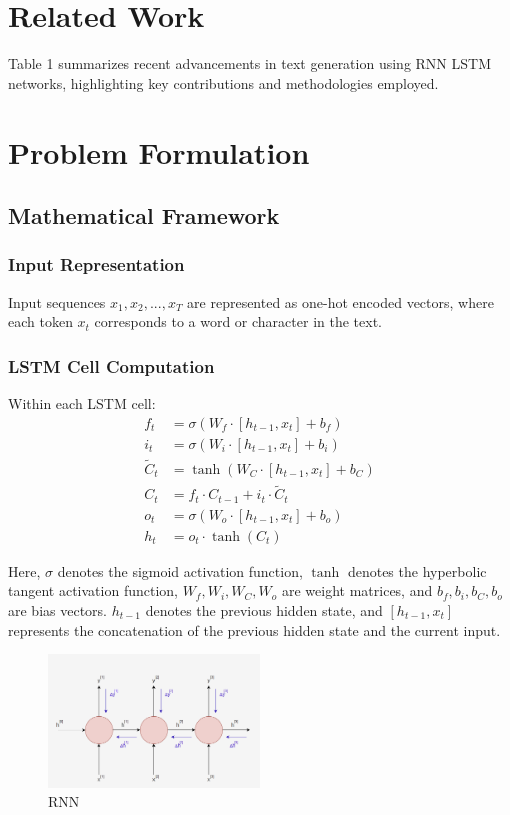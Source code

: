 \documentclass[conference]{IEEEtran}
\begin{document}
\section{Related Work}
Table 1 summarizes recent advancements in text generation using RNN LSTM networks, highlighting key contributions and methodologies employed.



\section{Problem Formulation}
\subsection{Mathematical Framework}

\subsubsection{Input Representation}
Input sequences \( x_1, x_2, ..., x_T \) are represented as one-hot encoded vectors, where each token \( x_t \) corresponds to a word or character in the text.

\subsubsection{LSTM Cell Computation}
Within each LSTM cell:
\begin{align}
f_t &= \sigma(W_f \cdot [h_{t-1}, x_t] + b_f) \\
i_t &= \sigma(W_i \cdot [h_{t-1}, x_t] + b_i) \\
\tilde{C}_t &= \tanh(W_C \cdot [h_{t-1}, x_t] + b_C) \\
C_t &= f_t \cdot C_{t-1} + i_t \cdot \tilde{C}_t \\
o_t &= \sigma(W_o \cdot [h_{t-1}, x_t] + b_o) \\
h_t &= o_t \cdot \tanh(C_t)
\end{align}

Here, \( \sigma \) denotes the sigmoid activation function, \( \tanh \) denotes the hyperbolic tangent activation function, \( W_f, W_i, W_C, W_o \) are weight matrices, and \( b_f, b_i, b_C, b_o \) are bias vectors. \( h_{t-1} \) denotes the previous hidden state, and \( [h_{t-1}, x_t] \) represents the concatenation of the previous hidden state and the current input.

\begin{figure}
    \centering
    \includegraphics[width=0.5\textwidth]{p3.png}
    \caption{RNN}
    \label{fig:example}
\end{figure}
\end{document}
